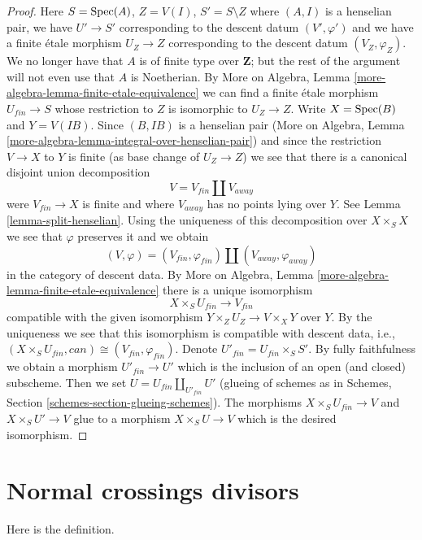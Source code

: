 \begin{proof}
\medskip\noindent
Here $S = \mathop{\mathrm{Spec}}(A)$, $Z = V(I)$, $S' = S \setminus Z$ where
$(A, I)$ is a henselian pair, we have $U' \to S'$ corresponding
to the descent datum $(V', \varphi')$ and we have a finite \'etale
morphism $U_Z \to Z$ corresponding to the descent datum
$(V_Z, \varphi_Z)$. We no longer have that $A$ is of finite type
over $\mathbf{Z}$; but the rest of the argument will not even use
that $A$ is Noetherian.
By More on Algebra, Lemma \ref{more-algebra-lemma-finite-etale-equivalence}
we can find a finite \'etale morphism $U_{fin} \to S$ whose
restriction to $Z$ is isomorphic to $U_Z \to Z$.
Write $X = \mathop{\mathrm{Spec}}(B)$ and $Y = V(IB)$. Since $(B, IB)$ is a henselian pair
(More on Algebra, Lemma \ref{more-algebra-lemma-integral-over-henselian-pair})
and since the restriction $V \to X$ to $Y$
is finite (as base change of $U_Z \to Z$) we see that
there is a canonical disjoint union decomposition
$$
V = V_{fin} \amalg V_{away}
$$
were $V_{fin} \to X$ is finite and where $V_{away}$ has no
points lying over $Y$. See Lemma \ref{lemma-split-henselian}.
Using the uniqueness of this decomposition over $X \times_S X$
we see that $\varphi$ preserves it and we obtain
$$
(V, \varphi) = (V_{fin}, \varphi_{fin}) \amalg (V_{away}, \varphi_{away})
$$
in the category of descent data.
By More on Algebra, Lemma \ref{more-algebra-lemma-finite-etale-equivalence}
there is a unique isomorphism
$$
X \times_S U_{fin} \longrightarrow V_{fin}
$$
compatible with the given isomorphism $Y \times_Z U_Z \to V \times_X Y$
over $Y$.
By the uniqueness we see that this isomorphism is compatible
with descent data, i.e.,
$(X \times_S U_{fin}, can) \cong (V_{fin}, \varphi_{fin})$.
Denote $U'_{fin} = U_{fin} \times_S S'$. By fully faithfulness
we obtain a morphism $U'_{fin} \to U'$ which is
the inclusion of an open (and closed) subscheme.
Then we set $U = U_{fin} \amalg_{U'_{fin}} U'$ (glueing of schemes as
in Schemes, Section \ref{schemes-section-glueing-schemes}).
The morphisms $X \times_S U_{fin} \to V$ and
$X \times_S U' \to V$ glue to a morphism $X \times_S U \to V$
which is the desired isomorphism.
\end{proof}





\section{Normal crossings divisors}
\label{section-normal-crossings}

\noindent
Here is the definition.

